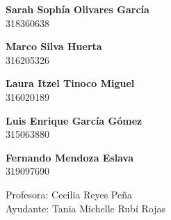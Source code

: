 \begin{titlepage}
    \vspace{5mm}

    \begin{minipage}{0.4\textwidth}
            \textbf{\large{Sarah Sophía Olivares García}}\\
            318360638
    \end{minipage}
    \begin{minipage}{0.4\textwidth}
        \begin{flushright}
            \textbf{\large{Marco Silva Huerta}}\\
            316205326        
        \end{flushright}
    \end{minipage}

    \vspace{5mm}

    \begin{minipage}{0.4\textwidth}
            \textbf{\large{Laura Itzel Tinoco Miguel}}\\
            316020189
    \end{minipage}
    \begin{minipage}{0.4\textwidth}
        \begin{flushright}
            \textbf{\large{Luis Enrique García Gómez}}\\    
            315063880
        \end{flushright}
    \end{minipage}

    \vspace{5mm}

    \begin{minipage}{0.4\textwidth}
            \textbf{\large{Fernando Mendoza Eslava}}\\
            319097690
    \end{minipage}
    \begin{minipage}{0.4\textwidth}
        \begin{flushright}

        \end{flushright}
    \end{minipage}

    \vspace{12mm}

    \begin{minipage}{0.8\textwidth}
        \begin{flushleft} \large
            Profesora: Cecilia Reyes Peña\\            
            Ayudante: Tania Michelle Rubí Rojas\\                    
        \end{flushleft}
    \end{minipage}


\end{titlepage}
